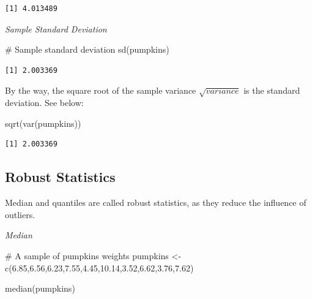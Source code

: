 \documentclass[
  letterpaper,
  DIV=11,
  numbers=noendperiod]{scrreprt}
\newenvironment{Shaded}{\begin{snugshade}}{\end{snugshade}}
\newcommand{\CommentTok}[1]{\textcolor[rgb]{0.37,0.37,0.37}{#1}}
\newcommand{\FloatTok}[1]{\textcolor[rgb]{0.68,0.00,0.00}{#1}}
\newcommand{\FunctionTok}[1]{\textcolor[rgb]{0.28,0.35,0.67}{#1}}
\newcommand{\NormalTok}[1]{\textcolor[rgb]{0.00,0.23,0.31}{#1}}
\newcommand{\OtherTok}[1]{\textcolor[rgb]{0.00,0.23,0.31}{#1}}
\begin{document}
\begin{verbatim}
[1] 4.013489
\end{verbatim}

\emph{Sample Standard Deviation}

\begin{Shaded}
\begin{Highlighting}[]
\CommentTok{\# Sample standard deviation}
\FunctionTok{sd}\NormalTok{(pumpkins)}
\end{Highlighting}
\end{Shaded}

\begin{verbatim}
[1] 2.003369
\end{verbatim}

By the way, the square root of the sample variance \(\sqrt{variance}\)
is the standard deviation. See below:

\begin{Shaded}
\begin{Highlighting}[]
\FunctionTok{sqrt}\NormalTok{(}\FunctionTok{var}\NormalTok{(pumpkins))}
\end{Highlighting}
\end{Shaded}

\begin{verbatim}
[1] 2.003369
\end{verbatim}

\subsection{Robust Statistics}\label{robust-statistics}

Median and quantiles are called robust statistics, as they reduce the
influence of outliers.

\emph{Median}

\begin{Shaded}
\begin{Highlighting}[]
\CommentTok{\# A sample of pumpkins\textquotesingle{} weights}
\NormalTok{pumpkins }\OtherTok{\textless{}{-}} \FunctionTok{c}\NormalTok{(}\FloatTok{6.85}\NormalTok{,}\FloatTok{6.56}\NormalTok{,}\FloatTok{6.23}\NormalTok{,}\FloatTok{7.55}\NormalTok{,}\FloatTok{4.45}\NormalTok{,}\FloatTok{10.14}\NormalTok{,}\FloatTok{3.52}\NormalTok{,}\FloatTok{6.62}\NormalTok{,}\FloatTok{3.76}\NormalTok{,}\FloatTok{7.62}\NormalTok{)}
\end{Highlighting}
\end{Shaded}

\begin{Shaded}
\begin{Highlighting}[]
\FunctionTok{median}\NormalTok{(pumpkins)}
\end{Highlighting}
\end{Shaded}
\end{document}
